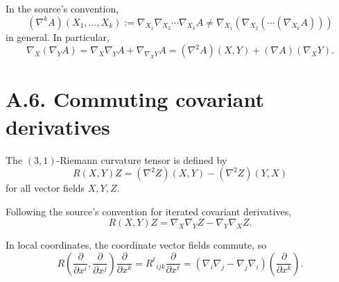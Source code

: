 \begin{remark}
\label{appa-rem-iterated-vs-nested-covariant-derivatives}

In the source's convention,
\[
(\nabla^k A)(X_1,\ldots,X_k):=\nabla_{X_1}\nabla_{X_2}\cdots\nabla_{X_k}A \neq \nabla_{X_1}(\nabla_{X_2}(\cdots(\nabla_{X_k}A)))
\]
in general. In particular,
\[
\nabla_X(\nabla_YA)=\nabla_X\nabla_YA+\nabla_{\nabla_XY}A=(\nabla^2A)(X,Y)+(\nabla A)(\nabla_XY).
\]
\end{remark}

\section*{A.6. Commuting covariant derivatives}

\begin{definition}
\label{appa-def-riemann-curvature-via-covariant-derivatives}


The \((3,1)\)-Riemann curvature tensor is defined by
\[
R(X,Y)Z=(\nabla^2 Z)(X,Y)-(\nabla^2 Z)(Y,X)
\]
for all vector fields \(X,Y,Z\).
\end{definition}

\begin{remark}
\label{appa-rem-curvature-commutator}

Following the source's convention for iterated covariant derivatives,
\[
R(X,Y)Z=\nabla_X\nabla_YZ-\nabla_Y\nabla_XZ.
\]
\end{remark}

\begin{remark}
\label{appa-rem-curvature-coordinate-form}

In local coordinates, the coordinate vector fields commute, so
\[
R\!\left(\frac{\partial}{\partial x^i},\frac{\partial}{\partial x^j}\right)\frac{\partial}{\partial x^k}
=R^\ell{}_{ijk}\frac{\partial}{\partial x^\ell}
=\left(\nabla_i\nabla_j-\nabla_j\nabla_i\right)\!\left(\frac{\partial}{\partial x^k}\right).
\]
\end{remark}

